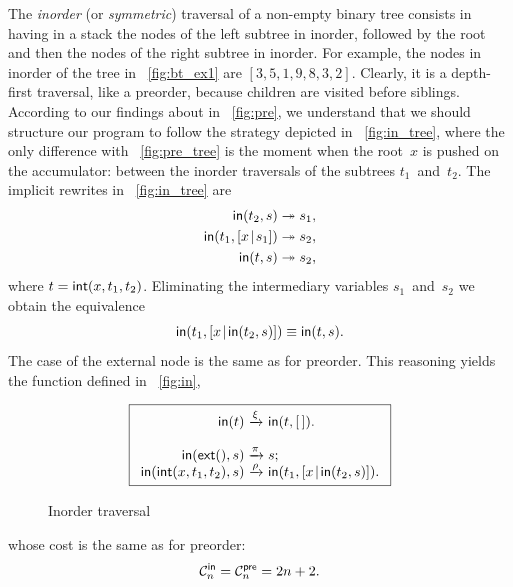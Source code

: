The \emph{inorder} (or \emph{symmetric}) traversal of a non\hyp{}empty
binary tree consists in having in a stack the nodes of the left
subtree in inorder, followed by the root and then the nodes of the
right subtree in inorder. For example, the nodes in inorder of the
tree in \fig~\vref{fig:bt_ex1} are \([3,5,1,9,8,3,2]\). Clearly, it is
a depth\hyp{}first traversal,
like a preorder, because children are visited before siblings.
According to our findings about  in
\fig~\vref{fig:pre}, we understand that we should structure our
program to follow the strategy depicted in \fig~\vref{fig:in_tree},
where the only difference with \fig~\ref{fig:pre_tree} is the moment
when the root~\(x\) is pushed on the accumulator: between the inorder traversals of the
subtrees \(t_1\)~and~\(t_2\). The implicit rewrites in
\fig~\ref{fig:in_tree} are
\begin{align*}
  \fun{in}(t_2,s) &\twoheadrightarrow s_1,\index{in@\fun{in/2}}\\
  \fun{in}(t_1,\cons{x}{s_1}) &\twoheadrightarrow s_2,\\
  \fun{in}(t,s) &\twoheadrightarrow s_2,
\end{align*}
where \(t=\textsf{int}(x,t_1,t_2)\). Eliminating the intermediary
variables \(s_1\)~and~\(s_2\) we obtain the equivalence
\begin{equation*}
  \textsf{in}(t_1,[{x}\!\mid\!{\textsf{in}(t_2,s)}]) \equiv \textsf{in}(t,s).
\end{equation*}
The case of the external node is the same as for preorder. This
reasoning yields the function defined in \fig~\vref{fig:in},
\begin{figure}[t]
\begin{equation*}
\boxed{
\begin{array}{r@{\;}c@{\;}l}
\fun{in}(t) & \xrightarrow{\xi} & \fun{in}(t,\el).\\
\\
\fun{in}(\fun{ext}(),s) & \xrightarrow{\smash{\pi}} & s;\\
\fun{in}(\fun{int}(x,t_1,t_2),s)
  & \xrightarrow{\smash{\rho}}
  & \fun{in}(t_1,\cons{x}{\fun{in}(t_2,s)}).
\end{array}}
\end{equation*}
\caption{Inorder traversal}
\label{fig:in}
\end{figure}
whose cost is the same as for preorder:
\begin{equation*}
  \C{\fun{in}}{n} = \C{\fun{pre}}{n} = 2n + 2.
  \index{in@$\C{\fun{in}}{n}$}
\end{equation*}

